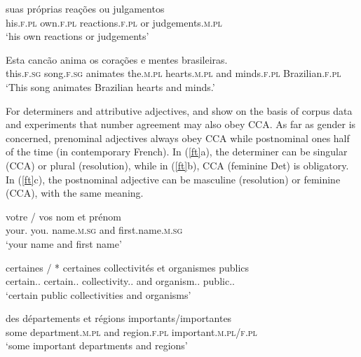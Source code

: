 \documentclass[output=paper
                ,modfonts
                ,nonflat
	        ,collection
	        ,collectionchapter
	        ,collectiontoclongg
 	        ,biblatex
                ,babelshorthands
                ,newtxmath
                ,draftmode
                ,colorlinks, citecolor=brown
]{./langsci/langscibook}
\begin{document}
{\begin{exe}
 \ex
\begin{xlista}
\ex \gll suas pr\'{o}prias rea\c{c}\~{o}es ou julgamentos \\
his.\textsc{f.pl} own.\textsc{f.pl} reactions.\textsc{f.pl} or judgements.\textsc{m.pl} \\
\glt `his own reactions or judgements' \citep[435]{Villavicencio:Sadler:ea:05}  


\ex \gll Esta canc\~{a}o anima os cora\c{c}\~{o}es e mentes brasileiras. \\
 this.\textsc{f.sg}  song.\textsc{f.sg} animates the.\textsc{m.pl} hearts.\textsc{m.pl} and minds.\textsc{f.pl} Brazilian.\textsc{f.pl} \\
\glt `This song animates Brazilian hearts and minds.' \citep[437]{Villavicencio:Sadler:ea:05} 
\end{xlista} \label{fo}
\end{exe}

For  determiners and attributive adjectives, \citet{An:Abeille:17} and \citet{Abeille:An:Shiraishi:18} show on the basis of corpus data and experiments that number agreement may also obey CCA. As far as gender is concerned, prenominal adjectives always obey CCA while postnominal ones half of the time (in contemporary French). In (\ref{ft}a), the determiner can be singular (CCA) or plural (resolution), while in (\ref{ft}b), CCA (feminine Det) is obligatory. In (\ref{ft}c), the postnominal adjective can be masculine (resolution) or feminine (CCA), with the same meaning.

\begin{exe}
 \ex
\begin{xlista}
\ex  
\gll votre / vos nom et pr\'{e}nom \\
     your.\sg{} {} you.\pl{} name.\textsc{m.sg} and first.name.\textsc{m.sg} \\
\glt `your name and first name' \citep[]{An:Abeille:17}

\ex 
\gll certaines          / *   certaines collectivités et organismes publics \\
     certain.\fem.\pl{} {} {} certain.\fem.\pl{} collectivity.\fem.\pl{} and organism.\mas.\pl{} public.\mas.\pl{} \\
\glt `certain public collectivities and organisms' \citep[]{Abeille:An:Shiraishi:18}

\ex 
\gll des d\'{e}partements et r\'{e}gions importants/importantes\\
     some department.\textsc{m.pl} and region.\textsc{f.pl} important.\textsc{m.pl}/\textsc{f.pl}\\
\glt `some important departments and regions'
\end{xlista}\label{ft}
\end{exe}


}
\end{document}

